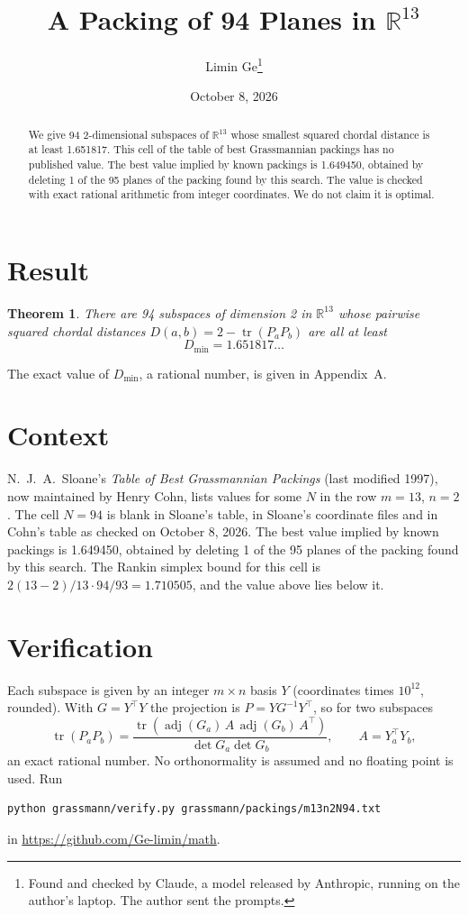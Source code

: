 \documentclass[11pt,a4paper]{article}
\title{A Packing of 94 Planes in $\mathbb{R}^{13}$}
\author{Limin Ge\thanks{Found and checked by Claude, a model released by Anthropic, running on the author's laptop. The author sent the prompts.}}
\date{October 8, 2026}
\newtheorem*{theorem}{Theorem}
\begin{document}
\maketitle
\begin{abstract}
We give 94 2-dimensional subspaces of $\mathbb{R}^{13}$ whose smallest squared chordal distance is at least 1.651817. This cell of the table of best Grassmannian packings has no published value. The best value implied by known packings is 1.649450, obtained by deleting 1 of the 95 planes of the packing found by this search. The value is checked with exact rational arithmetic from integer coordinates. We do not claim it is optimal.
\end{abstract}

\section{Result}
\begin{theorem}
There are 94 subspaces of dimension 2 in $\mathbb{R}^{13}$ whose pairwise squared chordal distances $D(a,b) = 2 - \operatorname{tr}(P_aP_b)$ are all at least
\[ D_{\min} = 1.651817\ldots \]
\end{theorem}
The exact value of $D_{\min}$, a rational number, is given in Appendix~A.


\section{Context}
N.~J.~A.~Sloane's \emph{Table of Best Grassmannian Packings} (last modified 1997), now maintained by Henry Cohn, lists values for some $N$ in the row $m=13$, $n=2$. The cell $N=94$ is blank in Sloane's table, in Sloane's coordinate files and in Cohn's table as checked on October 8, 2026. The best value implied by known packings is 1.649450, obtained by deleting 1 of the 95 planes of the packing found by this search. The Rankin simplex bound for this cell is $2(13-2)/13\cdot 94/93 = 1.710505$, and the value above lies below it.


\section{Verification}
Each subspace is given by an integer $m\times n$ basis $Y$ (coordinates times $10^{12}$, rounded). With $G=Y^\top Y$ the projection is $P=YG^{-1}Y^\top$, so for two subspaces
\[ \operatorname{tr}(P_aP_b)=\frac{\operatorname{tr}(\operatorname{adj}(G_a)\,A\,\operatorname{adj}(G_b)\,A^\top)}{\det G_a\det G_b},\qquad A=Y_a^\top Y_b, \]
an exact rational number. No orthonormality is assumed and no floating point is used. Run
\begin{verbatim}
python grassmann/verify.py grassmann/packings/m13n2N94.txt
\end{verbatim}
in \url{https://github.com/Ge-limin/math}.
\end{document}
